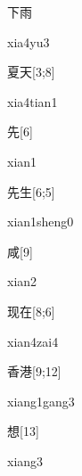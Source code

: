 \begin{verbete}[xia4yu3]{下雨}
\begin{pronuncia}{xia4yu3}
\end{pronuncia}
\end{verbete}

\begin{verbete}{夏天}[3;8]
\begin{pronuncia}{xia4tian1}
\end{pronuncia}
\end{verbete}

\begin{verbete}[xian1]{先}[6]
\begin{pronuncia}{xian1}
\end{pronuncia}
\end{verbete}

\begin{verbete}{先生}[6;5]
\begin{pronuncia}{xian1sheng0}
\end{pronuncia}
\end{verbete}

\begin{verbete}[xian2]{咸}[9]
\begin{pronuncia}{xian2}
\end{pronuncia}
\end{verbete}

\begin{verbete}{现在}[8;6]
\begin{pronuncia}{xian4zai4}
\end{pronuncia}
\end{verbete}

\begin{verbete}{香港}[9;12]
\begin{pronuncia}{xiang1gang3}
\end{pronuncia}
\end{verbete}

\begin{verbete}[xiang3]{想}[13]
\begin{pronuncia}{xiang3}
\end{pronuncia}
\end{verbete}

